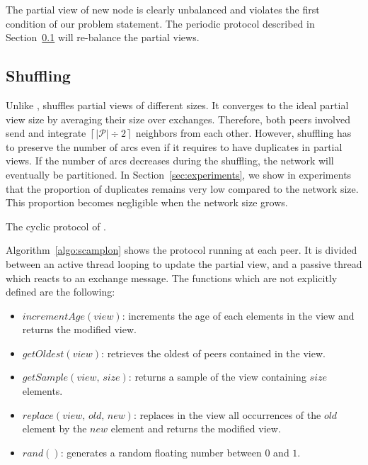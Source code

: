 The partial view of new node is clearly unbalanced and violates the
first condition of our problem statement. The periodic protocol
described in Section~\ref{subsec:cyclic} will re-balance the partial
views.

\subsection{Shuffling}
\label{subsec:cyclic}

Unlike \CYCLON, \SPRAY shuffles partial views of different sizes. It converges
to the ideal partial view size by averaging their size over
exchanges. Therefore, both peers involved send and integrate
$\left\lceil|\mathcal{P}| \div 2 \right\rceil$ neighbors from each
other. However, shuffling has to preserve the number of arcs even if it
requires to have duplicates in partial views. If the number of arcs decreases
during the shuffling, the network will eventually be partitioned. In
Section~\ref{sec:experiments}, we show in experiments that the proportion of
duplicates remains very low compared to the network size. This proportion
becomes negligible when the network size grows. 

\begin{algorithm}[h]
  
  \caption{\label{algo:scamplon}The cyclic protocol of \SPRAY.}
\end{algorithm}

Algorithm~\ref{algo:scamplon} shows the \SPRAY protocol running at each
peer. It is divided between an active thread looping to update the partial
view, and a passive thread which reacts to an exchange message. The functions
which are not explicitly defined are the following:
\begin{itemize}
\item $incrementAge(view)$: increments the age of each elements in the view
  and returns the modified view.
\item $getOldest(view)$: retrieves the oldest of peers contained in the view.
\item $getSample(view, \, size)$: returns a sample of the view containing
  $size$ elements.
\item $replace(view,\,old,\,new)$: replaces in the view all occurrences of
  the $old$ element by the $new$ element and returns the modified view.
\item $rand()$: generates a random floating number between $0$ and $1$.
\end{itemize}

